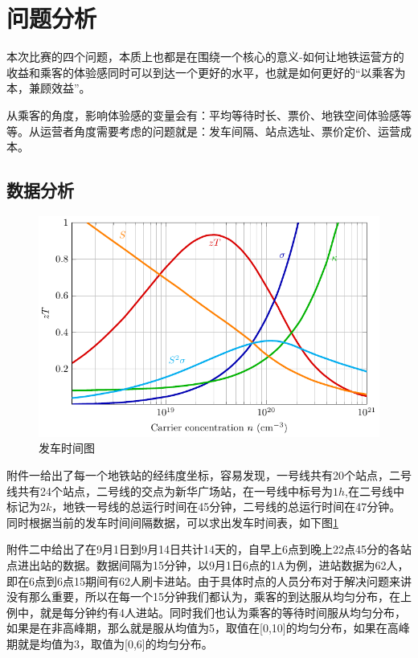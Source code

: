 \documentclass[12pt,a4paper]{mcmthesis}
\begin{document}
    \section{问题分析}

    本次比赛的四个问题，本质上也都是在围绕一个核心的意义-如何让地铁运营方的收益和乘客的体验感同时可以到达一个更好的水平，也就是如何更好的“以乘客为本，兼顾效益”。

    从乘客的角度，影响体验感的变量会有：平均等待时长、票价、地铁空间体验感等等。从运营者角度需要考虑的问题就是：发车间隔、站点选址、票价定价、运营成本。

    \subsection{数据分析}

    \begin{figure}[h!t]
        \centerline{\includegraphics[scale=0.4]{figures/fig1}\quad
        }
        \caption{\song\wuhao
        发车时间图}
        \label{fig:发车时间图}
    \end{figure}

    附件一给出了每一个地铁站的经纬度坐标，容易发现，一号线共有20个站点，二号线共有24个站点，二号线的交点为新华广场站，在一号线中标号为$1h$,在二号线中标记为$2k$，地铁一号线的总运行时间在45分钟，二号线的总运行时间在47分钟。同时根据当前的发车时间间隔数据，可以求出发车时间表，如下图\ref{fig:发车时间图}

    附件二中给出了在9月1日到9月14日共计14天的，自早上6点到晚上22点45分的各站点进出站的数据。数据间隔为15分钟，以9月1日6点的1A为例，进站数据为62人，即在6点到6点15期间有62人刷卡进站。由于具体时点的人员分布对于解决问题来讲没有那么重要，所以在每一个15分钟我们都认为，乘客的到达服从均匀分布，在上例中，就是每分钟约有4人进站。同时我们也认为乘客的等待时间服从均匀分布，如果是在非高峰期，那么就是服从均值为5，取值在[0,10]的均匀分布，如果在高峰期就是均值为3，取值为[0,6]的均匀分布。
\end{document}
